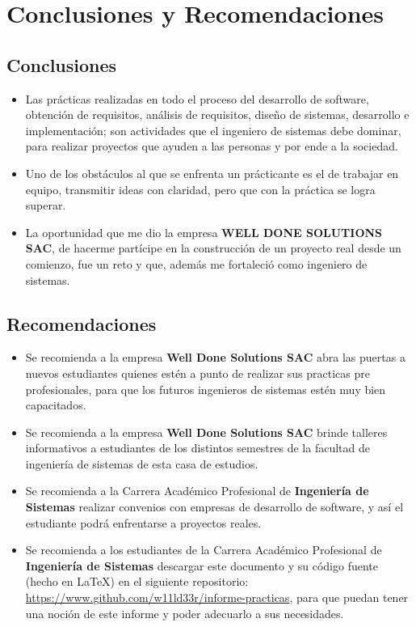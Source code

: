 \chapter{Conclusiones y Recomendaciones}
	
	\section{Conclusiones}
		\begin{itemize}
		  \item {Las prácticas realizadas en todo el proceso del desarrollo de software,
		obtención de requisitos, análisis de requisitos, diseño de sistemas,
		desarrollo e implementación; son actividades que el ingeniero de sistemas
		debe dominar, para realizar proyectos que ayuden a las personas y por ende a
		la sociedad.}

			\item {Uno de los obstáculos al que se enfrenta un prácticante es el de
			trabajar en equipo, transmitir ideas con claridad, pero que con la práctica
			se logra superar.}
			
			\item {La oportunidad que me dio la empresa {\bf WELL DONE SOLUTIONS SAC}, de
			hacerme partícipe en la construcción de un proyecto real desde un comienzo,
			fue un reto y que, además me fortaleció como ingeniero de sistemas. }
		\end{itemize}
		
	\section{Recomendaciones}
		\begin{itemize}
		  \item {Se recomienda a la empresa {\bf Well Done Solutions SAC} abra las
		  puertas a nuevos estudiantes quienes estén a punto de realizar sus
		  practicas pre profesionales, para que los futuros ingenieros de sistemas
		  estén muy bien capacitados.}
		  
		  \item {Se recomienda a la empresa {\bf Well Done Solutions SAC} brinde
		  talleres informativos a estudiantes de los distintos semestres de la
		  facultad de ingeniería de sistemas de esta casa de estudios.}
		  
		  \item {Se recomienda a la Carrera Académico Profesional de {\bf Ingeniería
		  de Sistemas} realizar convenios con empresas de  desarrollo de software, y así el estudiante
		  podrá enfrentarse a proyectos reales.}
		  
		  \item {Se recomienda a los estudiantes de la Carrera Académico Profesional de {\bf Ingeniería
		  de Sistemas} descargar este documento y su código fuente (hecho en {\LaTeX})
		  en el siguiente repositorio:
		  \href{https://www.github.com/w11ld33r/informe-practicas}{https://www.github.com/w11ld33r/informe-practicas}, para que puedan tener una noción de este informe y poder adecuarlo a sus necesidades.}
		  
		\end{itemize}